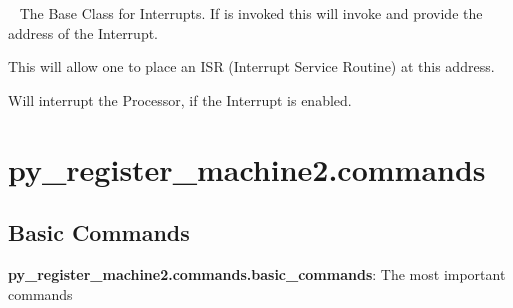 \documentclass[letterpaper,10pt,english]{sphinxmanual}
\begin{document}

\begin{fulllineitems}
\label{core:py_register_machine2.core.interrupts.Interrupt}~\label{core:interrupt}
The Base Class for Interrupts. 
If  is invoked this will invoke  and provide the address of the 
Interrupt.

This will allow one to place an ISR (Interrupt Service Routine) at this address.

\begin{fulllineitems}
\label{core:py_register_machine2.core.interrupts.Interrupt.interrupt}
Will interrupt the Processor, if the Interrupt is enabled.

\end{fulllineitems}


\end{fulllineitems}



\chapter{py\_register\_machine2.commands}
\label{commands::doc}\label{commands:py-register-machine2-commands}

\section{Basic Commands}
\label{commands:basic-commands}\label{commands:module-py_register_machine2.commands.basic_commands}
\textbf{py\_register\_machine2.commands.basic\_commands}: The most important commands
\end{document}
